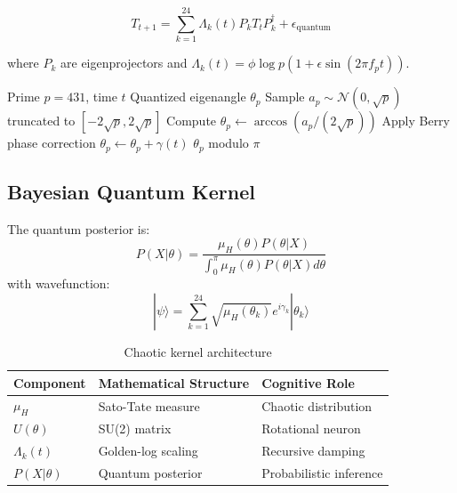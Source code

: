 \documentclass[12pt]{article}
\begin{document}
\begin{equation}
T_{t+1} = \sum_{k=1}^{24} \Lambda_k(t)P_k T_t P_k^\dagger + \epsilon_{\text{quantum}}
\end{equation}

where $P_k$ are eigenprojectors and $\Lambda_k(t)=\phi\log p(1+\epsilon\sin(2\pi f_p t))$.

\begin{algorithm}[H]
\caption{Haar Measure Quantization}
\begin{algorithmic}[1]
\Require Prime $p=431$, time $t$
\Ensure Quantized eigenangle $\theta_p$
\State Sample $a_p \sim \mathcal{N}(0,\sqrt{p})$ truncated to $[-2\sqrt{p},2\sqrt{p}]$
\State Compute $\theta_p \gets \arccos(a_p/(2\sqrt{p}))$
\State Apply Berry phase correction $\theta_p \gets \theta_p + \gamma(t)$
\State \Return $\theta_p$ modulo $\pi$
\end{algorithmic}
\end{algorithm}

\subsection{Bayesian Quantum Kernel}
\begin{definition}
The quantum posterior is:
\[
P(X|\theta) = \frac{\mu_H(\theta)P(\theta|X)}{\int_0^\pi \mu_H(\theta)P(\theta|X)d\theta}
\]
with wavefunction:
\[
|\psi\rangle = \sum_{k=1}^{24} \sqrt{\mu_H(\theta_k)}e^{i\gamma_k}|\theta_k\rangle
\]
\end{definition}

\begin{table}[h]
\centering
\begin{tabular}{lll}
\toprule
\textbf{Component} & \textbf{Mathematical Structure} & \textbf{Cognitive Role} \\
\midrule
$\mu_H$ & Sato-Tate measure & Chaotic distribution \\
$U(\theta)$ & SU(2) matrix & Rotational neuron \\
$\Lambda_k(t)$ & Golden-log scaling & Recursive damping \\
$P(X|\theta)$ & Quantum posterior & Probabilistic inference \\
\bottomrule
\end{tabular}
\caption{Chaotic kernel architecture}
\end{table}
\end{document}
